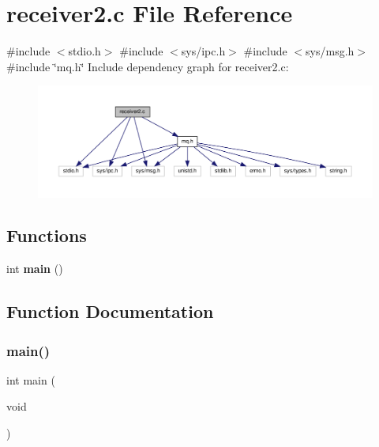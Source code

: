 \section{receiver2.\+c File Reference}
\label{receiver2_8c}
{\ttfamily \#include $<$stdio.\+h$>$}\newline
{\ttfamily \#include $<$sys/ipc.\+h$>$}\newline
{\ttfamily \#include $<$sys/msg.\+h$>$}\newline
{\ttfamily \#include \char`\"{}mq.\+h\char`\"{}}\newline
Include dependency graph for receiver2.\+c\+:\nopagebreak
\begin{figure}[H]
\begin{center}
\leavevmode
\includegraphics[width=350pt]{receiver2_8c__incl}
\end{center}
\end{figure}
\subsection*{Functions}
\begin{DoxyCompactItemize}
\item 
int \textbf{ main} ()
\end{DoxyCompactItemize}


\subsection{Function Documentation}
\mbox{\label{receiver2_8c_ae66f6b31b5ad750f1fe042a706a4e3d4}} 
\subsubsection{main()}
{\footnotesize\ttfamily int main (\begin{DoxyParamCaption}\item[{void}]{ }\end{DoxyParamCaption})}

